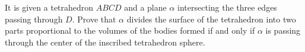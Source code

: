 It is given a tetrahedron $ABCD$ and a plane $\alpha$ intersecting the three edges passing through $D$. Prove that $\alpha$ divides the surface of the tetrahedron into two parts proportional to the volumes of the bodies formed if and only if $\alpha$ is passing through the center of the inscribed tetrahedron sphere.
